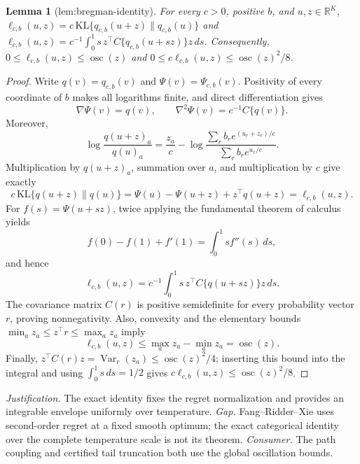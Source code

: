 \documentclass{article}
\newtheorem{lemma}{Lemma}
\begin{document}
\begin{lemma}[lem:bregman-identity]\label{lem:bregman-identity}
For every \(c>0\), positive \(b\), and \(u,z\in\mathbb R^K\), \(\ell_{c,b}(u,z)=c\,\mathrm{KL}\{q_{c,b}(u+z)\|q_{c,b}(u)\}\) and \(\ell_{c,b}(u,z)=c^{-1}\int_0^1s\,z^{\top}C\{q_{c,b}(u+sz)\}z\,ds\). Consequently, \(0\le\ell_{c,b}(u,z)\le\operatorname{osc}(z)\) and \(0\le c\ell_{c,b}(u,z)\le\operatorname{osc}(z)^2/8\).
\end{lemma}
\begin{proof}
Write \(q(v)=q_{c,b}(v)\) and \(\Psi(v)=\Psi_{c,b}(v)\).  Positivity of every coordinate of \(b\) makes all logarithms finite, and direct differentiation gives
\[
 \nabla\Psi(v)=q(v),\qquad \nabla^2\Psi(v)=c^{-1}C\{q(v)\}.
\]
Moreover,
\[
 \log\frac{q(u+z)_a}{q(u)_a}
 =\frac{z_a}{c}-\log\frac{\sum_rb_r e^{(u_r+z_r)/c}}
                              {\sum_rb_r e^{u_r/c}}.
\]
Multiplication by \(q(u+z)_a\), summation over \(a\), and multiplication by \(c\) give exactly
\[
 c\,\mathrm{KL}\{q(u+z)\|q(u)\}
 =\Psi(u)-\Psi(u+z)+z^\top q(u+z)=\ell_{c,b}(u,z).
\]
For \(f(s)=\Psi(u+sz)\), twice applying the fundamental theorem of calculus yields
\[
 f(0)-f(1)+f'(1)=\int_0^1s f''(s)\,ds,
\]
and hence
\[
 \ell_{c,b}(u,z)=c^{-1}\int_0^1s\,z^\top C\{q(u+sz)\}z\,ds.
\]
The covariance matrix \(C(r)\) is positive semidefinite for every probability vector \(r\), proving nonnegativity.  Also, convexity and the elementary bounds \(\min_a z_a\le z^\top r\le\max_a z_a\) imply
\[
 \ell_{c,b}(u,z)\le \max_a z_a-\min_a z_a=\operatorname{osc}(z).
\]
Finally, \(z^\top C(r)z=\operatorname{Var}_r(z_a)\le\operatorname{osc}(z)^2/4\); inserting this bound into the integral and using \(\int_0^1s\,ds=1/2\) gives \(c\ell_{c,b}(u,z)\le\operatorname{osc}(z)^2/8\).
\end{proof}
\par\smallskip\noindent \textit{Justification.} The exact identity fixes the regret normalization and provides an integrable envelope uniformly over temperature. \textit{Gap.} Fang--Ridder--Xie uses second-order regret at a fixed smooth optimum; the exact categorical identity over the complete temperature scale is not its theorem. \textit{Consumer.} The path coupling and certified tail truncation both use the global oscillation bounds.
\end{document}
